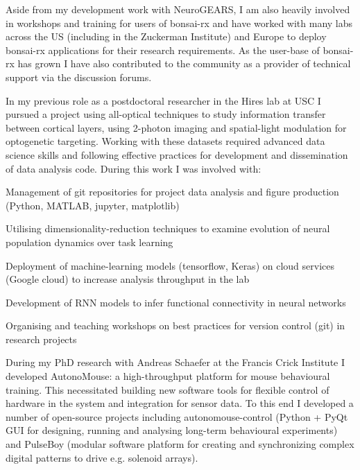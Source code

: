 \documentclass[11pt, letterpaper]{awesome-cv}
\begin{document}
Aside from my development work with NeuroGEARS, I am also heavily involved in workshops and training for users of bonsai-rx and have worked with many labs across the US (including in the Zuckerman Institute) and Europe to deploy bonsai-rx applications for their research requirements. As the user-base of bonsai-rx has grown I have also contributed to the community as a provider of technical support via the discussion forums.

In my previous role as a postdoctoral researcher in the Hires lab at USC I pursued a project using all-optical techniques to study information transfer between cortical layers, using 2-photon imaging and spatial-light modulation for optogenetic targeting. Working with these datasets required advanced data science skills and following effective practices for development and dissemination of data analysis code. During this work I was involved with:
\vspace{1em}
\begin{cvitems}
  \item {Management of git repositories for project data analysis and figure production (Python, MATLAB, jupyter, matplotlib)}
  \item {Utilising dimensionality-reduction techniques to examine evolution of neural population dynamics over task learning}
  \item {Deployment of machine-learning models (tensorflow, Keras) on cloud services (Google cloud) to increase analysis throughput in the lab}
  \item {Development of RNN models to infer functional connectivity in neural networks}
  \item {Organising and teaching workshops on best practices for version control (git) in research projects}
\end{cvitems}
\vspace{1em}

During my PhD research with Andreas Schaefer at the Francis Crick Institute I developed AutonoMouse: a high-throughput platform for mouse behavioural training. This necessitated building new software tools for flexible control of hardware in the system and integration for sensor data. To this end I developed a number of open-source projects including autonomouse-control (Python + PyQt GUI for designing, running and analysing long-term behavioural experiments) and PulseBoy (modular software platform for creating and synchronizing complex digital patterns to drive e.g. solenoid arrays).
\end{document}
